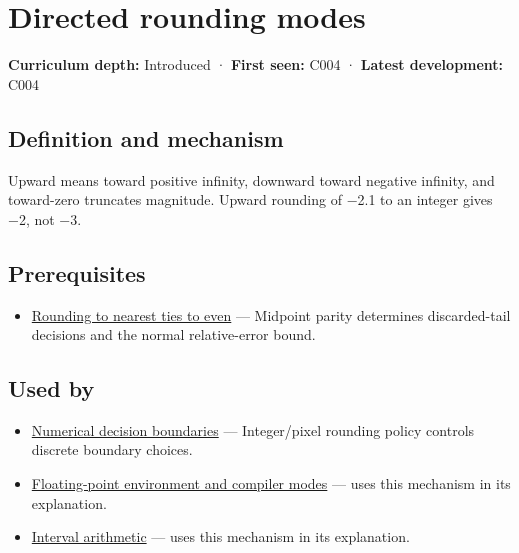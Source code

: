 \hypertarget{appendix-637d164ae5ca}{}\label{referencestart:appendix-637d164ae5ca}
\section{Directed rounding modes}\label{appendix-637d164ae5ca-directed-rounding-modes}

\hypertarget{appendix-637d164ae5ca-directed-rounding-modes}{}

\textbf{Curriculum depth:} Introduced · \textbf{First seen:} C004 · \textbf{Latest development:} C004

\begin{allmightroledefinition}

\subsection{Definition and mechanism}\label{appendix-637d164ae5ca-definition-and-mechanism}

\hypertarget{appendix-637d164ae5ca-definition-and-mechanism}{}

Upward means toward positive infinity, downward toward negative infinity, and toward-zero truncates magnitude. Upward rounding of −2.1 to an integer gives −2, not −3.

\end{allmightroledefinition}

\subsection{Prerequisites}\label{appendix-637d164ae5ca-prerequisites}

\hypertarget{appendix-637d164ae5ca-prerequisites}{}

\begin{itemize}
\tightlist
\item
  \hyperref[appendix-614afe1de592]{Rounding to nearest ties to even} --- Midpoint parity determines discarded-tail decisions and the normal relative-error bound.
\end{itemize}

\subsection{Used by}\label{appendix-637d164ae5ca-used-by}

\hypertarget{appendix-637d164ae5ca-used-by}{}

\begin{itemize}
\item
  \hyperref[appendix-c80db39080be]{Numerical decision boundaries} --- Integer/pixel rounding policy controls discrete boundary choices.
\item
  \hyperref[appendix-f11d1a521253]{Floating-point environment and compiler modes} --- uses this mechanism in its explanation.
\item
  \hyperref[appendix-1823a14330cb]{Interval arithmetic} --- uses this mechanism in its explanation.
\end{itemize}

